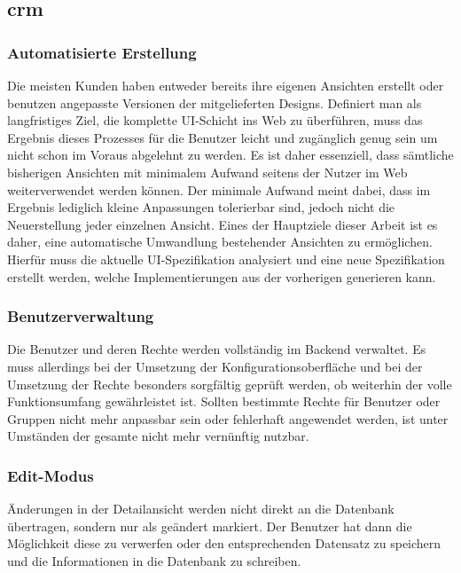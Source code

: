 \subsection{\acrlong{crm}}
\subsubsection{Automatisierte Erstellung}
Die meisten Kunden haben entweder bereits ihre eigenen Ansichten erstellt oder benutzen angepasste Versionen der mitgelieferten Designs. Definiert man als langfristiges Ziel, die komplette UI-Schicht ins Web zu überführen, muss das Ergebnis dieses Prozesses für die Benutzer leicht und zugänglich genug sein um nicht schon im Voraus abgelehnt zu werden. Es ist daher essenziell, dass sämtliche bisherigen Ansichten mit minimalem Aufwand seitens der Nutzer im Web weiterverwendet werden können. Der minimale Aufwand meint dabei, dass im Ergebnis lediglich kleine Anpassungen tolerierbar sind, jedoch nicht die Neuerstellung jeder einzelnen Ansicht. Eines der Hauptziele dieser Arbeit ist es daher, eine automatische Umwandlung bestehender Ansichten zu ermöglichen. Hierfür muss die aktuelle UI-Spezifikation analysiert und eine neue Spezifikation erstellt werden, welche Implementierungen aus der vorherigen generieren kann.

\subsubsection{Benutzerverwaltung}
Die Benutzer und deren Rechte werden vollständig im Backend verwaltet. Es muss allerdings bei der Umsetzung der Konfigurationsoberfläche und bei der Umsetzung der Rechte besonders sorgfältig geprüft werden, ob weiterhin der volle Funktionsumfang gewährleistet ist. Sollten bestimmte Rechte für Benutzer oder Gruppen nicht mehr anpassbar sein  oder fehlerhaft angewendet werden, ist unter Umständen der gesamte  nicht mehr vernünftig nutzbar.

\subsubsection{Edit-Modus}
Änderungen in der Detailansicht werden nicht direkt an die Datenbank übertragen, sondern nur als geändert markiert. Der Benutzer hat dann die Möglichkeit diese zu verwerfen oder den entsprechenden Datensatz zu speichern und die Informationen in die Datenbank zu schreiben.

